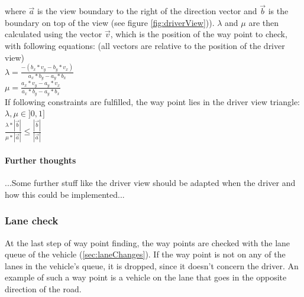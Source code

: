 \noindent where $\vec{a}$ is the view boundary to the right of the direction 
vector and $\vec{b}$ is the boundary on top of the view (see figure 
\ref{fig:driverView})). $\lambda$ and $\mu$ are then calculated using the 
vector $\vec{v}$, which is the position of the way point to check, with following
equations: (all vectors are relative to the position of the driver view) \\

$ \lambda = \frac{-(b_x*v_y - b_y * v_x)}{a_x * b_y - a_y * b_x}$\\

$\mu = \frac{a_x * v_y - a_y * v_x}{a_x * b_y - a_y * b_x} $ \\

\noindent If following constraints are fulfilled, the way point lies in the driver
view triangle: \\

$ \lambda, \mu \in ]0, 1]$ \\

$ \frac{\lambda * \left| \vec{b} \right| }{\mu * \left| \vec{a} \right|} \leq 
\frac{\left| \vec{b} \right|}{\left| \vec{a} \right|}$

\paragraph{Further thoughts}
...Some further stuff like the driver view should be adapted when the driver
and how this could be implemented...


\subsubsection{Lane check}

At the last step of way point finding, the way points are checked with the
lane queue of the vehicle (\ref{sec:laneChanges}). If the way point is not
on any of the lanes in the vehicle's queue, it is dropped, since it doesn't
concern the driver. An example of such a way point is a vehicle on the lane
that goes in the opposite direction of the road.
